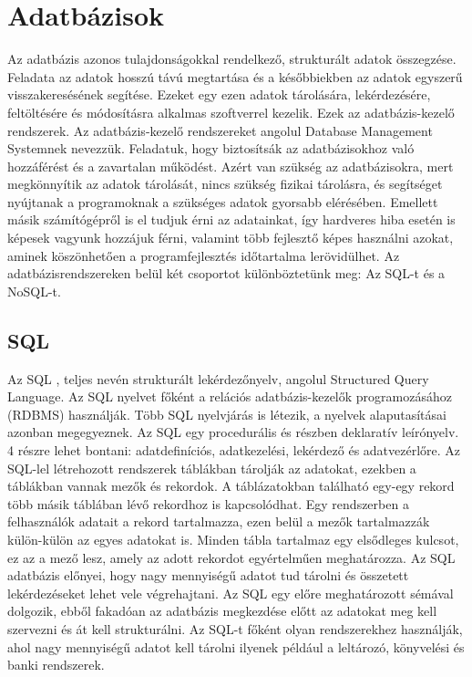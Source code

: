 \section{Adatbázisok}
Az adatbázis azonos tulajdonságokkal rendelkező, strukturált adatok összegzése. Feladata az adatok hosszú távú megtartása és a későbbiekben az adatok egyszerű visszakeresésének segítése. Ezeket egy ezen adatok tárolására, lekérdezésére, feltöltésére és módosításra alkalmas szoftverrel kezelik. Ezek az adatbázis-kezelő rendszerek. Az adatbázis-kezelő rendszereket angolul Database Management Systemnek nevezzük. Feladatuk, hogy biztosítsák az adatbázisokhoz való hozzáférést és a zavartalan működést. Azért van szükség az adatbázisokra, mert megkönnyítik az adatok tárolását, nincs szükség fizikai tárolásra, és segítséget nyújtanak a programoknak a szükséges adatok gyorsabb elérésében. Emellett másik számítógépről is el tudjuk érni az adatainkat, így hardveres hiba esetén is képesek vagyunk hozzájuk férni, valamint több fejlesztő képes használni azokat, aminek köszönhetően a programfejlesztés időtartalma lerövidülhet.
Az adatbázisrendszereken \cite{10} belül két csoportot különböztetünk meg: Az SQL-t és a NoSQL-t.

\subsection{SQL}
Az SQL \cite{11}, teljes nevén strukturált lekérdezőnyelv, angolul Structured Query Language. Az SQL nyelvet főként a relációs adatbázis-kezelők programozásához (RDBMS) használják. Több SQL nyelvjárás is létezik, a nyelvek alaputasításai azonban megegyeznek. Az SQL egy procedurális és részben deklaratív leírónyelv. 4 részre lehet bontani: adatdefiníciós, adatkezelési, lekérdező és adatvezérlőre. Az SQL-lel létrehozott rendszerek táblákban tárolják az adatokat, ezekben a táblákban vannak mezők és rekordok. A táblázatokban található egy-egy rekord több másik táblában lévő rekordhoz is kapcsolódhat. Egy rendszerben a felhasználók adatait a rekord tartalmazza, ezen belül a mezők tartalmazzák külön-külön az egyes adatokat is. Minden tábla tartalmaz egy elsődleges kulcsot, ez az a mező lesz, amely az adott rekordot egyértelműen meghatározza. Az SQL adatbázis előnyei, hogy nagy mennyiségű adatot tud tárolni és összetett lekérdezéseket lehet vele végrehajtani. Az SQL egy előre meghatározott sémával dolgozik, ebből fakadóan az adatbázis megkezdése előtt az adatokat meg kell szervezni és át kell strukturálni. Az SQL-t főként olyan rendszerekhez használják, ahol nagy mennyiségű adatot kell tárolni ilyenek például a leltározó, könyvelési és banki rendszerek.
